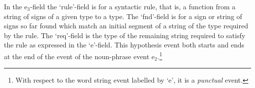\begin{ex} 
\end{ex}
In the e$_3$-field the  `rule'-field is for a syntactic rule, that is,
a function from a string of signs of a given type to a type.  The
`fnd'-field is for a sign or string of signs so far found which match an initial
segment of a string of the type required by the rule.  The `req'-field
is the type of the remaining string required to satisfy the rule as
expressed in the `e'-field.  This hypothesis event both starts and
ends at the end of the event of the noun-phrase event
e$_2$.\footnote{With respect to the word string event labelled by `e',
  it is a \textit{punctual} event.} 

